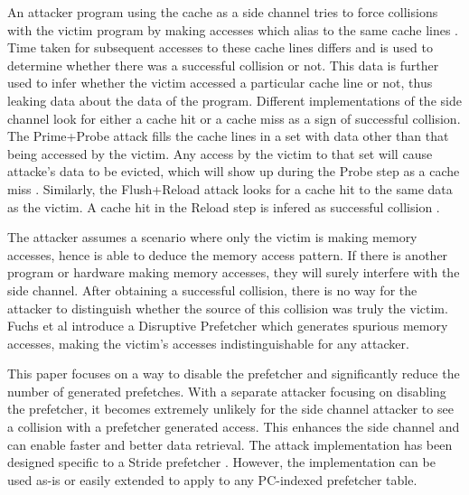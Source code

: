 \documentclass[conference]{IEEEtran}
\begin{document}
An attacker program using the cache as a side channel tries to force
collisions with the victim program by making accesses which alias to the
same cache lines \cite{osvik-cache-attacks}.
Time taken for subsequent accesses to these cache lines differs and is used to
determine whether there was a successful collision or not.
This data is further used to infer whether the victim accessed a particular
cache line or not, thus leaking data about the data of the program.
Different implementations of the side channel look for either a cache
hit or a cache miss as a sign of successful collision.
The Prime+Probe attack fills the cache lines in a set with data other than
that being accessed by the victim. Any access by the victim to that set will
cause attacke's data to be evicted, which will show up during the Probe step
as a cache miss \cite{osvik-cache-attacks}.
Similarly, the Flush+Reload attack looks for a cache hit to the same
data as the victim. A cache hit in the Reload step is infered as successful
collision \cite{percival-rsa}.

The attacker assumes a scenario where only the victim is making memory
accesses, hence is able to deduce the memory access pattern. If there is
another program or hardware making memory accesses, they will surely
interfere with the side channel. After obtaining a successful collision,
there is no way for the attacker to distinguish whether the source of
this collision was truly the victim. Fuchs et al \cite{fuchs-disruptive}
introduce a Disruptive Prefetcher which generates spurious memory accesses,
making the victim's accesses indistinguishable for any attacker.

This paper focuses on a way to disable the prefetcher and significantly reduce
the number of generated prefetches. With a separate attacker focusing on disabling
the prefetcher, it becomes extremely unlikely for the side channel attacker to
see a collision with a prefetcher generated access. This enhances the side channel
and can enable faster and better data retrieval.
The attack implementation has been designed specific to a Stride prefetcher
\cite{fu-stride}. However, the implementation can be used as-is or easily extended
to apply to any PC-indexed prefetcher table.
\end{document}
